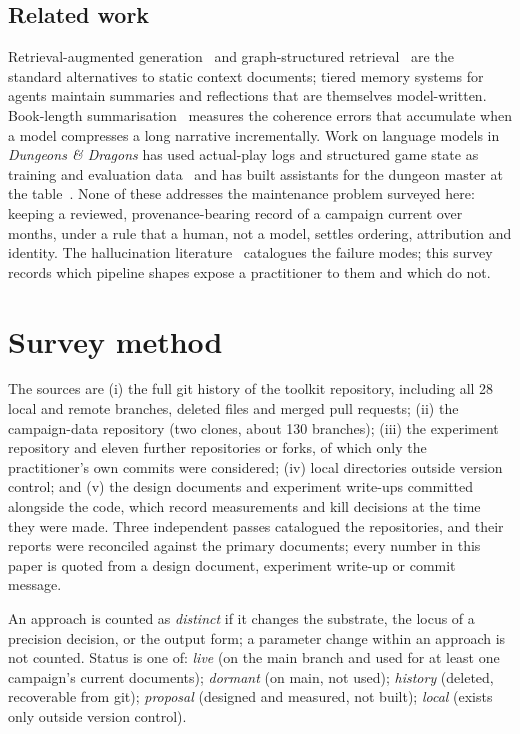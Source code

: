 \documentclass[11pt]{article}
\begin{document}
\subsection{Related work}
Retrieval-augmented generation~\cite{lewis2020rag} and graph-structured retrieval~\cite{edge2024graphrag}
are the standard alternatives to static context documents; tiered memory systems for agents
\cite{packer2023memgpt,park2023generative} maintain summaries and reflections that are themselves
model-written. Book-length summarisation~\cite{chang2024booookscore} measures the coherence errors
that accumulate when a model compresses a long narrative incrementally. Work on language models in
\emph{Dungeons \& Dragons} has used actual-play logs and structured game state as training and
evaluation data~\cite{callisonburch2022dnd,zhu2023fireball} and has built assistants for the
dungeon master at the table~\cite{zhu2023calypso}. None of these addresses the maintenance problem
surveyed here: keeping a reviewed, provenance-bearing record of a campaign current over months, under
a rule that a human, not a model, settles ordering, attribution and identity. The hallucination
literature~\cite{ji2023survey} catalogues the failure modes; this survey records which pipeline shapes
expose a practitioner to them and which do not.

\section{Survey method}
\label{sec:method}
The sources are (i) the full git history of the toolkit repository, including all 28 local and remote
branches, deleted files and merged pull requests; (ii) the campaign-data repository (two clones,
about 130 branches); (iii) the experiment repository and eleven further repositories or forks, of
which only the practitioner's own commits were considered; (iv) local directories outside version
control; and (v) the design documents and experiment write-ups committed alongside the code, which
record measurements and kill decisions at the time they were made. Three independent passes
catalogued the repositories, and their reports were reconciled against the primary documents; every
number in this paper is quoted from a design document, experiment write-up or commit message.

An approach is counted as \emph{distinct} if it changes the substrate, the locus of a precision
decision, or the output form; a parameter change within an approach is not counted. Status is one
of: \emph{live} (on the main branch and used for at least one campaign's current documents);
\emph{dormant} (on main, not used); \emph{history} (deleted, recoverable from git);
\emph{proposal} (designed and measured, not built); \emph{local} (exists only outside version
control).
\end{document}
